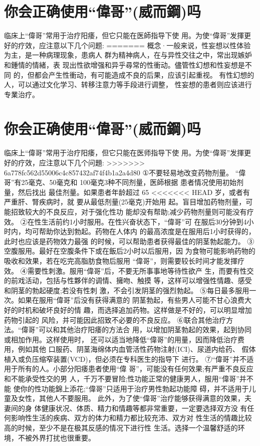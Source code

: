 \documentclass[12pt,UTF8]{ctexbook}
\begin{document}
\section{你会正确使用“偉哥”(威而鋼)吗}

临床上“偉哥”常用于治疗阳痿，但它只能在医師指导下使
用。为使“偉哥”发揮更好的疗效，应注意以下几个问题:
=======
概念·一般来说，性妄想以性体验为主，是一种病理现象，患病人
群为精神病人，在与异性交往之中，常出现嫉妒和鍾情的情緒，表
现出性欲增强和异乎尋常的性衝动。儘管性幻想和性妄想是不同
的，但都会产生性衝动，有可能造成不良的后果，应该引起重视。
有性幻想的人，可以通过文化学习、转移注意力等手段进行调整，
性妄想的患者则应该进行专業治疗。

\section{你会正确使用“偉哥”(威而鋼)吗}

临床上“偉哥”常用于治疗阳痿，但它只能在医师指导下使
用。为使“偉哥”发揮更好的疗效，应注意以下几个问題:
>>>>>>> 6a778fc562d55006c4c857432af74f4b1a2a4d80
①不要轻易地改变药物剂量。
“偉哥”有25毫克、50毫克和
100毫克3种不同剂量，医師根据
患者情况使用初始剂量，然后找出
最佳剂量。如果患者年龄超过 65
<<<<<<< HEAD
岁，或者有严重肝、腎疾病时，就
要从最低剂量(25毫克)开始用
起。盲目增加药物剂量，可能招致较大的不良反应，对于强化性功
能却没有帮助;减少药物剂量则可能没有疗效。
②在性生活前约1小时服用。在性兴奋状态下，“偉哥”可
在服后30分钟到4小时内，均可帮助你达到勃起。药物在人体内
的最高浓度是在服用后1小时获得的，此时也应该是药物效力最强
的时候，可以帮助患者获得最佳的阴茎勃起能力。
③空腹服用。最好在空腹条件下或在飯后2小时以后服用，因
为食物可能影响药物的吸收和效果，若在吃完高脂肪食物后服用
“偉哥”，则需要较长时间才能发揮疗效。
④需要性刺激。服用“偉哥”后，不要无所事事地等待性欲产
生，而要有性交的前戏活动，包括与性夥伴的调情、擁吻、触摸
等，这样可以增强性情趣、感受和阴茎的勃起硬度;若没有性刺
激，不会引发阴茎的强烈勃起。
⑤每日最多服用一次。如果在服用“偉哥”后没有获得满意的
阴茎勃起，有些男人可能不甘心浪费大好的时机和破坏良好的情
趣，而选择追加药物。这样做是不好的，可以明显增加药物引起的
风险，并可能因此招致不必要的不良反应。
⑥联合其他治疗方法。“偉哥”可以和其他治疗阳痿的方法合
用，以增加阴茎勃起的效果，起到协同或相加作用。这样使用时，
还可以适当地降低“偉哥”的用量，因而降低治疗费用，例如其他
口服药、阴茎海绵体内血管活性药物注射(ICI)、尿道内给药、
假体植入或负压缩窄装置(VCD)，但必须在专科医生的指导下
进行。
⑦“偉哥”并不适用于所有的人。小部分阳痿患者使用“偉
哥”，可能没有任何效果;有严重不良反应和不能承受性交的男
人，千万不要冒险;性功能正常的健康男人，服用“偉哥”并不能
使你的性功能錦上添花;“偉哥”只适用于治疗男性勃起功能障
碍，并不适用于儿童及女性，其他人不要服用。
此外，为了使“偉哥”治疗能够获得满意的效果，夫妻间的身
体健康状况、体质、精力和情趣等都非常重要，一定要选择双方没
有任何影响性生活的疾病、双方的体力和精力都比较充沛、双方对
性生活的情趣比较高的时候，至少不是在极其反感的情况下进行性
生活。选择一个温馨舒适的环境，不被外界打扰也很重要。
\end{document}
